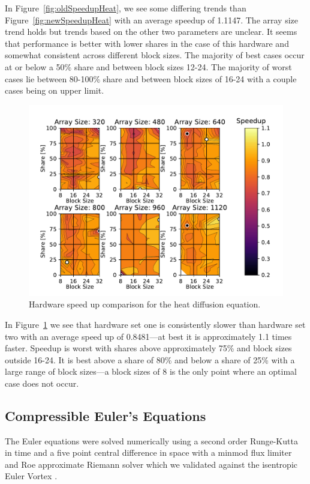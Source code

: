 \documentclass[review]{elsarticle}
\begin{document}
In Figure~\ref{fig:oldSpeedupHeat}, we see some differing trends than Figure~\ref{fig:newSpeedupHeat} with an average speedup of 1.1147. The array size trend holds but trends based on the other two parameters are unclear. It seems that performance is better with lower shares in the case of this hardware and somewhat consistent across different block sizes. The majority of best cases occur at or below a 50\% share and between block sizes 12-24. The majority of worst cases lie between 80-100\% share and between block sizes of 16-24 with a couple cases being on upper limit.

\begin{figure}[htb!]
    \centering
    \includegraphics[scale=0.7]{figs/hardwareSpeedupheat.pdf}
    \caption{Hardware speed up comparison for the heat diffusion equation.}
    \label{fig:heatHardwareComp}
\end{figure}

In Figure~\ref{fig:heatHardwareComp} we see that hardware set one is consistently slower than hardware set two with an average speed up of 0.8481---at best it is approximately 1.1 times faster. Speedup is worst with shares above approximately 75\% and block sizes outside 16-24. It is best above a share of 80\% and below a share of 25\% with a large range of block sizes---a block sizes of 8 is the only point where an optimal case does not occur.

\subsection{Compressible Euler's Equations}
\label{eulerVortexResults}
The Euler equations were solved numerically using a second order Runge-Kutta in time and a five point central difference in space with a minmod flux limiter and Roe approximate Riemann solver which we  validated against the isentropic Euler Vortex \cite{SpiegelAMethods}.
\end{document}
